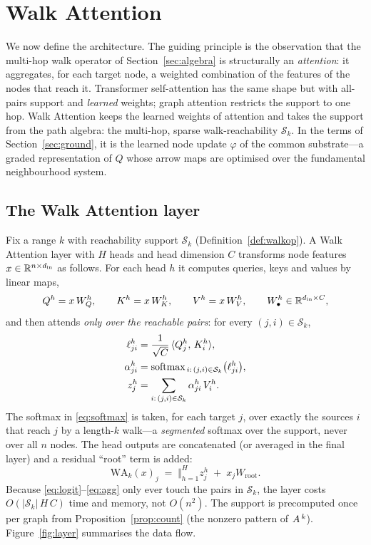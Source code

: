 \section{Walk Attention}\label{sec:model}

We now define the architecture. The guiding principle is the observation that the
multi-hop walk operator of Section~\ref{sec:algebra} is structurally an
\emph{attention}: it aggregates, for each target node, a weighted combination of
the features of the nodes that reach it. Transformer self-attention
\cite{vaswani2017attention} has the same shape but with all-pairs support and
\emph{learned} weights; graph attention \cite{velickovic2017graph} restricts the
support to one hop. Walk Attention keeps the learned weights of attention and
takes the support from the path algebra: the multi-hop, sparse walk-reachability
$\mathcal{S}_k$. In the terms of Section~\ref{sec:ground}, it is the learned node
update $\varphi$ of the common substrate---a graded representation of $Q$ whose
arrow maps are optimised over the fundamental neighbourhood system.

\subsection{The Walk Attention layer}

Fix a range $k$ with reachability support $\mathcal{S}_k$
(Definition~\ref{def:walkop}). A Walk Attention layer with $H$ heads and head
dimension $C$ transforms node features $x\in\mathbb{R}^{n\times d_{\text{in}}}$ as
follows. For each head $h$ it computes queries, keys and values by linear maps,
\[
  Q^h = x\,W^h_Q,\qquad K^h = x\,W^h_K,\qquad V^h = x\,W^h_V,
  \qquad W^h_\bullet\in\mathbb{R}^{d_{\text{in}}\times C},
\]
and then attends \emph{only over the reachable pairs}: for every
$(j,i)\in\mathcal{S}_k$,
\begin{align}
  \ell^h_{ji} &= \frac{1}{\sqrt{C}}\,\langle Q^h_j,\,K^h_i\rangle, \label{eq:logit}\\
  \alpha^h_{ji} &= \operatorname{softmax}_{\,i:\,(j,i)\in\mathcal{S}_k}\bigl(\ell^h_{ji}\bigr),
    \label{eq:softmax}\\
  z^h_j &= \sum_{i:\,(j,i)\in\mathcal{S}_k}\alpha^h_{ji}\,V^h_i. \label{eq:agg}
\end{align}
The softmax in \eqref{eq:softmax} is taken, for each target $j$, over exactly the
sources $i$ that reach $j$ by a length-$k$ walk---a \emph{segmented} softmax over
the support, never over all $n$ nodes. The head outputs are concatenated (or
averaged in the final layer) and a residual ``root'' term is added:
\[
  \mathrm{WA}_k(x)_j \;=\; \bigl\Vert_{h=1}^{H} z^h_j \;+\; x_j W_{\!\text{root}}.
\]
Because \eqref{eq:logit}--\eqref{eq:agg} only ever touch the pairs in
$\mathcal{S}_k$, the layer costs $O(|\mathcal{S}_k|\,H\,C)$ time and memory, not
$O(n^2)$. The support is precomputed once per graph from
Proposition~\ref{prop:count} (the nonzero pattern of $A^{\,k}$).
Figure~\ref{fig:layer} summarises the data flow.

